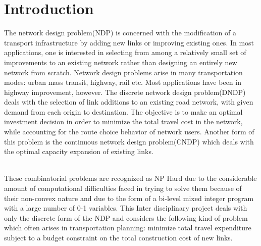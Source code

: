 \documentclass[a4paper, 12pt]{article}
\begin{document}
\section{Introduction}
The network design problem(NDP) is concerned with the modification of a transport infrastructure by adding new links or improving existing ones. In most applications, one is interested in selecting from among a relatively small set of improvements to an existing network rather than designing an entirely new network from scratch. Network design problems arise in many transportation modes: urban mass transit, highway, rail etc. Most applications have been in highway improvement, however. The discrete network design problem(DNDP) deals with the selection of link additions to an existing road network, with given demand from each origin to destination. The objective is to make an optimal investment decision in order to minimize the total travel cost in the network, while accounting for the route choice behavior of network users. Another form of this problem is the continuous network design problem(CNDP) which deals with the optimal capacity expansion of existing links.\par
\noindent
\\These combinatorial problems are recognized as NP Hard due to the considerable amount of computational difficulties faced in trying to solve them because of their non-convex nature and due to the form of a bi-level mixed integer program with a large number of 0-1 variables. This Inter disciplinary project deals with only the discrete form of the NDP and considers the following kind of problem which often arises in transportation planning: minimize total travel expenditure subject to a budget constraint on the total construction cost of new links.
 
\end{document}

